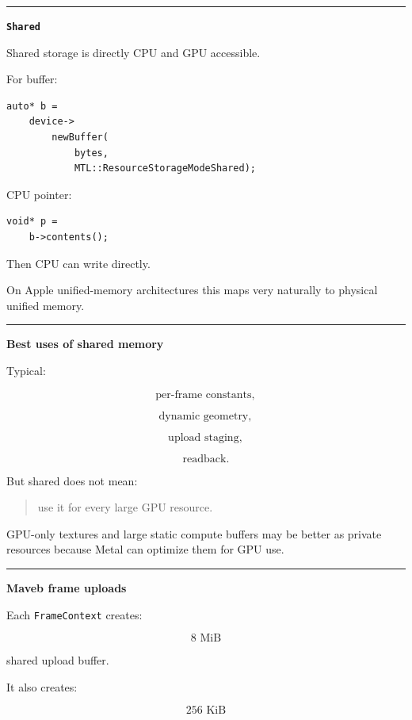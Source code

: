 \begin{center}\rule{0.5\linewidth}{0.5pt}\end{center}

\textbf{\texttt{Shared}}

Shared storage is directly CPU and GPU accessible.

For buffer:

\begin{verbatim}
auto* b =
    device->
        newBuffer(
            bytes,
            MTL::ResourceStorageModeShared);
\end{verbatim}

CPU pointer:

\begin{verbatim}
void* p =
    b->contents();
\end{verbatim}

Then CPU can write directly.

On Apple unified-memory architectures this maps very naturally to physical unified memory.

\begin{center}\rule{0.5\linewidth}{0.5pt}\end{center}

\textbf{Best uses of shared memory}

Typical:

\[
\text{per-frame constants},
\]

\[
\text{dynamic geometry},
\]

\[
\text{upload staging},
\]

\[
\text{readback}.
\]

But shared does not mean:

\begin{quote}
use it for every large GPU resource.
\end{quote}

GPU-only textures and large static compute buffers may be better as private resources because Metal can optimize them for GPU use.

\begin{center}\rule{0.5\linewidth}{0.5pt}\end{center}

\textbf{Maveb frame uploads}

Each \texttt{FrameContext} creates:

\[
8\text{ MiB}
\]

shared upload buffer.

It also creates:

\[
256\text{ KiB}
\]

